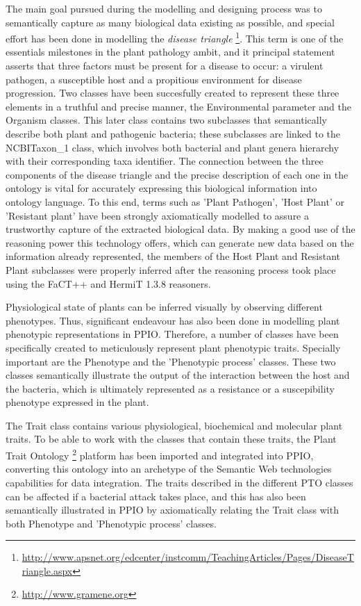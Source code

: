 \documentclass[sw]{iosart2c}
\newcommand{\myurl}[1]{\footnote{\url{#1}}}
\begin{document}
The main goal pursued during the modelling and designing process was to semantically capture as many biological data existing as possible, and special effort has been done in modelling the {\itshape disease triangle} \myurl{http://www.apsnet.org/edcenter/instcomm/TeachingArticles/Pages/DiseaseTriangle.aspx}. This term is one of the essentials milestones in the plant pathology ambit, and it principal statement asserts that three factors must be present for a disease to occur: a virulent pathogen, a susceptible host and a propitious environment for disease progression. Two classes have been succesfully created to represent these three elements in a truthful and precise manner, the {\sf Environmental parameter} and the {\sf Organism} classes. This later class contains two subclasses that semantically describe both plant and pathogenic bacteria; these subclasses are linked to the {\sf NCBITaxon\_1} class, which involves both bacterial and plant genera hierarchy with their corresponding taxa identifier. The connection between the three components of the disease triangle and the precise description of each one in the ontology is vital for accurately expressing this biological information into ontology language. To this end, terms such as {\sf 'Plant Pathogen'}, {\sf 'Host Plant'} or { \sf 'Resistant plant'} have been strongly axiomatically modelled to assure a trustworthy capture of the extracted biological data. By making a good use of the reasoning power this technology offers, which can generate new data based on the information already represented, the members of the {\sf Host Plant} and {\sf Resistant Plant} subclasses were properly inferred after the reasoning process took place using the FaCT++ and HermiT 1.3.8 reasoners.

Physiological state of plants can be inferred visually by observing different phenotypes. Thus, significant endeavour has also been done in modelling plant phenotypic representations in PPIO. Therefore, a number of classes have been specifically created to meticulously represent plant phenotypic traits. Specially important are the {\sf Phenotype} and the {\sf 'Phenotypic process'} classes. These two classes semantically illustrate the output of the interaction between the host and the bacteria, which is ultimately represented as a resistance or a suscepibility phenotype expressed in the plant.
 
The {\sf Trait} class contains various physiological, biochemical and molecular plant traits. To be able to work with the classes that contain these traits, the Plant Trait Ontology \myurl{http://www.gramene.org} platform \cite{PTO} has been imported and integrated into PPIO, converting this ontology into an archetype of the Semantic Web technologies capabilities for data integration. The traits described in the different PTO classes can be affected if a bacterial attack takes place, and this has also been semantically illustrated in PPIO by axiomatically relating the {\sf Trait} class with both {\sf Phenotype} and {\sf 'Phenotypic process'} classes.
\end{document}
